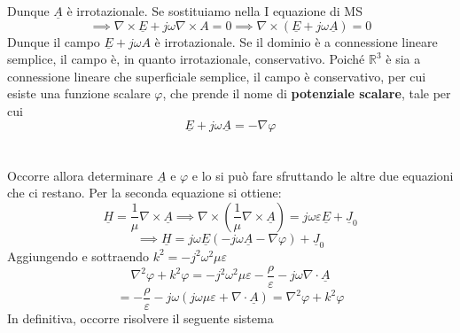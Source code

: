 \documentclass{book}
\begin{document}
            Dunque $\underline{A}$ è irrotazionale. Se sostituiamo nella I equazione di MS
            \begin{equation}
                \implies \nabla \times \underline{E} + j \omega \nabla \times A = 0 \implies \nabla \times (\underline{E}+j \omega \underline{A}) = 0
            \end{equation}
            Dunque il campo $\underline{E}+j\omega A$ è irrotazionale. Se il dominio è a connessione lineare semplice, il campo è, in quanto irrotazionale, conservativo. Poiché $\mathbb{R} ^{3}$ è sia a connessione
            lineare che superficiale semplice, il campo è conservativo, per cui esiste una funzione scalare $\varphi$, che prende il nome di \textbf{potenziale scalare}, tale per cui
            \begin{equation}
                \underline{E}+j \omega \underline{A} = - \nabla \varphi
            \end{equation} \\ \\
            Occorre allora determinare $\underline{A}$ e $\varphi$ e lo si può fare sfruttando le altre due equazioni che ci restano. Per la seconda equazione si ottiene:
            \begin{equation}
                \underline{H} = \frac{1}{\mu} \nabla \times \underline{A} \implies \nabla \times (\frac{1}{\mu} \nabla \times \underline{A}) = j \omega \varepsilon \underline{E}+\underline{J}_{0} 
            \end{equation}
            \begin{equation}
                \implies \underline{H} = j \omega \underline{E}(-j \omega \underline{A}- \nabla \varphi)+\underline{J}_{0}
            \end{equation}
            Aggiungendo e sottraendo $k^{2} = -j^{2} \omega ^{2} \mu \varepsilon$
            \begin{equation}
                \nabla ^{2} \varphi + k ^{2} \varphi = -j^{2} \omega ^{2} \mu \varepsilon - \frac{\rho}{\varepsilon}-j \omega \nabla \cdot \underline{A}
            \end{equation}
            \begin{equation}
                = - \frac{\rho}{\varepsilon}-j\omega (j \omega \mu \varepsilon + \nabla \cdot \underline{A})= \nabla ^{2} \varphi+k ^{2} \varphi
            \end{equation}
            In definitiva, occorre risolvere il seguente sistema
\end{document}
